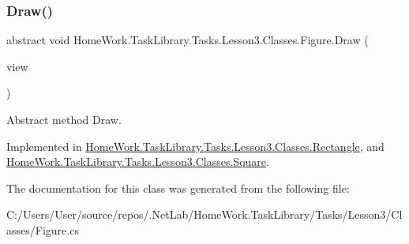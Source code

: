 \subsubsection{\texorpdfstring{Draw()}{Draw()}}
{\footnotesize\ttfamily abstract void Home\+Work.\+Task\+Library.\+Tasks.\+Lesson3.\+Classes.\+Figure.\+Draw (\begin{DoxyParamCaption}\item[{I\+Information}]{view }\end{DoxyParamCaption})\hspace{0.3cm}{\ttfamily [pure virtual]}}



Abstract method Draw. 



Implemented in \mbox{\hyperlink{class_home_work_1_1_task_library_1_1_tasks_1_1_lesson3_1_1_classes_1_1_rectangle_a28c3ba3c0b3e01c16d86db7777f59cf0}{Home\+Work.\+Task\+Library.\+Tasks.\+Lesson3.\+Classes.\+Rectangle}}, and \mbox{\hyperlink{class_home_work_1_1_task_library_1_1_tasks_1_1_lesson3_1_1_classes_1_1_square_adeccae1e360884d3ab80165ee3a47d7a}{Home\+Work.\+Task\+Library.\+Tasks.\+Lesson3.\+Classes.\+Square}}.



The documentation for this class was generated from the following file\+:\begin{DoxyCompactItemize}
\item 
C\+:/\+Users/\+User/source/repos/.\+Net\+Lab/\+Home\+Work.\+Task\+Library/\+Tasks/\+Lesson3/\+Classes/Figure.\+cs\end{DoxyCompactItemize}
